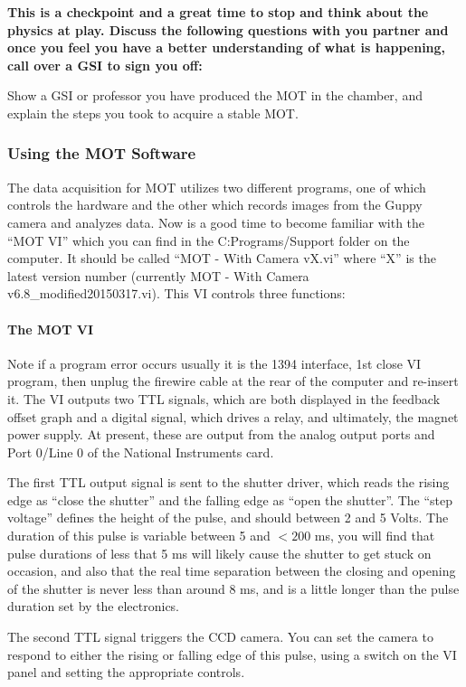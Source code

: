 \documentclass{../lab}
\begin{document}
\textbf{This is a checkpoint and a great time to stop and think about the physics at play. Discuss the following questions with you partner and once you feel you have a better understanding of what is happening, call over a GSI to sign you off:}

Show a GSI or professor you have produced the MOT in the chamber, and explain the steps you took to acquire a stable MOT.

\subsubsection{Using the MOT Software}

The data acquisition for MOT utilizes two different programs, one of which controls the hardware and the other which records images from the Guppy camera and analyzes data. Now is a good time to become familiar with the ``MOT VI'' which you can find in the C:Programs/Support folder on the computer. It should be called ``MOT - With Camera vX.vi'' where ``X'' is the latest version number (currently MOT - With Camera v6.8\_modified20150317.vi). This VI controls three functions:

\paragraph{The MOT VI}

Note if a program error occurs usually it is the 1394 interface, 1st close VI program, then unplug the firewire cable at the rear of the computer and re-insert it. The VI outputs two TTL signals, which are both displayed in the feedback offset graph and a digital signal, which drives a relay, and ultimately, the magnet power supply. At present, these are output from the analog output ports and Port 0/Line 0 of the National Instruments card.

The first TTL output signal is sent to the shutter driver, which reads the rising edge as ``close the shutter'' and the falling edge as ``open the shutter''. The ``step voltage'' defines the height of the pulse, and should between 2 and 5 Volts. The duration of this pulse is variable between 5 and $<200$ ms, you will find that pulse durations of less that 5 ms will likely cause the shutter to get stuck on occasion, and also that the real time separation between the closing and opening of the shutter is never less than around 8 ms, and is a little longer than the pulse duration set by the electronics.

The second TTL signal triggers the CCD camera. You can set the camera to respond to either the rising or falling edge of this pulse, using a switch on the VI panel and setting the appropriate controls.
\end{document}
